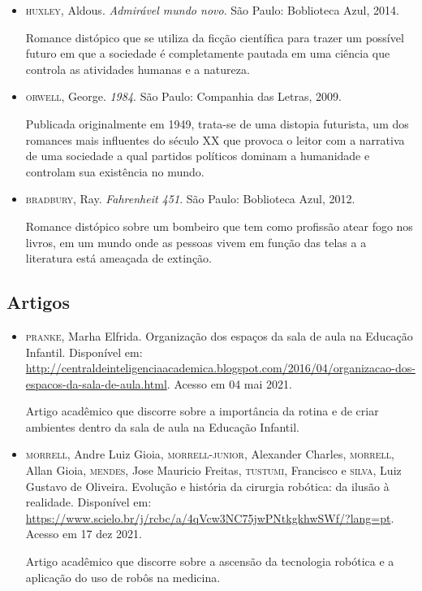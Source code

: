 \documentclass[11pt]{extarticle}
\begin{document}
\begin{itemize}
\item \textsc{huxley}, Aldous. \textit{Admirável mundo novo}. São Paulo: Boblioteca Azul, 2014.

Romance distópico que se utiliza da ficção científica para trazer um possível futuro em que a sociedade é completamente pautada em uma ciência que controla as atividades humanas e a natureza.  

\item \textsc{orwell}, George. \textit{1984}. São Paulo: Companhia das Letras, 2009.

Publicada originalmente em 1949, trata-se de uma distopia futurista, um dos romances mais influentes do século XX que provoca o leitor com a narrativa de uma sociedade a qual partidos políticos dominam a humanidade e controlam sua existência no mundo.

\item \textsc{bradbury}, Ray. \textit{Fahrenheit 451}. São Paulo: Boblioteca Azul, 2012.

Romance distópico sobre um bombeiro que tem como profissão atear fogo nos livros, em um mundo onde as pessoas vivem em função das telas a a literatura está ameaçada de extinção.

\end{itemize}

\subsection{Artigos}

\begin{itemize}
\item \textsc{pranke}, Marha Elfrida. Organização dos espaços da sala de aula na Educação Infantil. Disponível em: \url{http://centraldeinteligenciaacademica.blogspot.com/2016/04/organizacao-dos-espacos-da-sala-de-aula.html}. Acesso em 04 mai 2021. 

Artigo acadêmico que discorre sobre a importância da rotina e de criar ambientes dentro da sala de aula na Educação Infantil.

\item \textsc{morrell}, Andre Luiz Gioia, \textsc{morrell-junior}, Alexander Charles, \textsc{morrell}, Allan Gioia, \textsc{mendes}, Jose Mauricio Freitas, \textsc{tustumi}, Francisco e \textsc{silva}, Luiz Gustavo de Oliveira. Evolução e história da cirurgia robótica: da ilusão à realidade. Disponível em: \url{https://www.scielo.br/j/rcbc/a/4qVcw3NC75jwPNtkgkhwSWf/?lang=pt}. Acesso em 17 dez 2021. 

Artigo acadêmico que discorre sobre a ascensão da tecnologia robótica e a aplicação do uso de robôs na medicina. 
\end{itemize}
\end{document}

